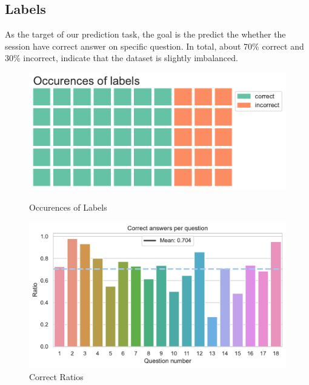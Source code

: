 \documentclass[11pt,a4paper]{article}
\begin{document}
    \subsection{Labels}
    As the target of our prediction task, the goal is the predict the whether the session have correct answer on specific question. In total, about 70\% correct and 30\% incorrect, indicate that the dataset is slightly imbalanced.
    \begin{figure}[H]
        \centering
        \begin{minipage}{0.5\textwidth}
            \centering
            \includegraphics[width=\textwidth]{EDA_plot/labels.pdf} %
            \caption{Occurences of Labels}
        \end{minipage}\hfill
        \begin{minipage}{0.5\textwidth}
            \centering
            \includegraphics[width=\textwidth]{EDA_plot/correct_ratios.pdf} %
            \caption{Correct Ratios}
        \end{minipage}
    \end{figure}
    
\end{document}
